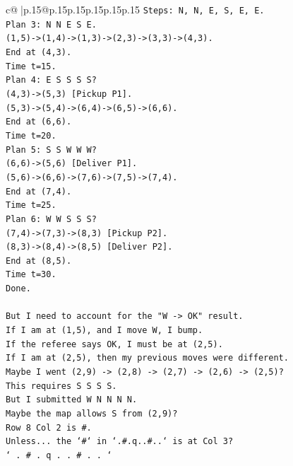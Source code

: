 \documentclass{article}
\begin{document}
{\begin{supertabular}{c@{$\;$}|p{.15\linewidth}@{}p{.15\linewidth}p{.15\linewidth}p{.15\linewidth}p{.15\linewidth}p{.15\linewidth}}
{{{\texttt{Steps: N, N, E, S, E, E.} \\
\texttt{Plan 3: N N E S E.} \\
\texttt{(1,5){-}>(1,4){-}>(1,3){-}>(2,3){-}>(3,3){-}>(4,3).} \\
\texttt{End at (4,3).} \\
\texttt{Time t=15.} \\
\texttt{Plan 4: E S S S S?} \\
\texttt{(4,3){-}>(5,3) {[}Pickup P1{]}.} \\
\texttt{(5,3){-}>(5,4){-}>(6,4){-}>(6,5){-}>(6,6).} \\
\texttt{End at (6,6).} \\
\texttt{Time t=20.} \\
\texttt{Plan 5: S S W W W?} \\
\texttt{(6,6){-}>(5,6) {[}Deliver P1{]}.} \\
\texttt{(5,6){-}>(6,6){-}>(7,6){-}>(7,5){-}>(7,4).} \\
\texttt{End at (7,4).} \\
\texttt{Time t=25.} \\
\texttt{Plan 6: W W S S S?} \\
\texttt{(7,4){-}>(7,3){-}>(8,3) {[}Pickup P2{]}.} \\
\texttt{(8,3){-}>(8,4){-}>(8,5) {[}Deliver P2{]}.} \\
\texttt{End at (8,5).} \\
\texttt{Time t=30.} \\
\texttt{Done.} \\
\\ 
\texttt{But I need to account for the "W {-}> OK" result.} \\
\texttt{If I am at (1,5), and I move W, I bump.} \\
\texttt{If the referee says OK, I must be at (2,5).} \\
\texttt{If I am at (2,5), then my previous moves were different.} \\
\texttt{Maybe I went (2,9) {-}> (2,8) {-}> (2,7) {-}> (2,6) {-}> (2,5)?} \\
\texttt{This requires S S S S.} \\
\texttt{But I submitted W N N N N.} \\
\texttt{Maybe the map allows S from (2,9)?} \\
\texttt{Row 8 Col 2 is \#.} \\
\texttt{Unless... the `\#` in `.\#.q..\#..` is at Col 3?} \\
\texttt{` . \# . q . . \# . . `} \\
}}}
\end{supertabular}}
\end{document}
